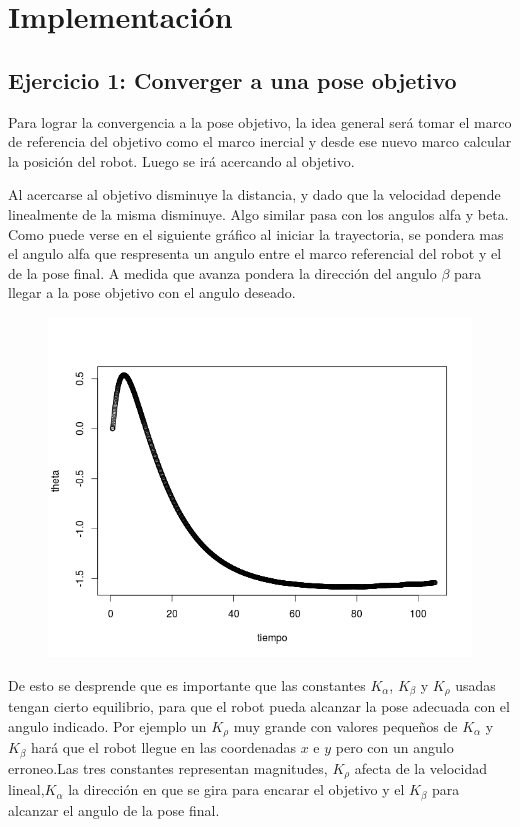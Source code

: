 \section{Implementación}

\subsection{Ejercicio 1: Converger a una pose objetivo}

Para lograr la convergencia a la pose objetivo, la idea general será tomar el marco de referencia del objetivo como el marco inercial y desde ese nuevo marco calcular la posición del robot. Luego se irá acercando al objetivo.

Al acercarse al objetivo disminuye la distancia, y dado que la velocidad depende linealmente de la misma disminuye. Algo similar pasa con los angulos alfa y beta. Como puede verse en el siguiente gráfico al iniciar la trayectoria, se pondera mas el angulo alfa que respresenta un angulo entre el marco referencial del robot y el de la pose final. A medida que avanza pondera la dirección del angulo $\beta$ para llegar a la pose objetivo con el angulo deseado.

\begin{figure}[!h]
\begin{center}
\includegraphics[scale=0.5]{ejercicio1}
\end{center}
\end{figure}
De esto se desprende que es importante que las constantes $K_\alpha$, $K_\beta$ y $K_\rho$ usadas tengan cierto equilibrio, para que el robot pueda alcanzar la pose adecuada con el angulo indicado. Por ejemplo un $K_\rho$ muy grande con valores pequeños de $K_\alpha$ y $K_\beta$ hará que el robot llegue en las coordenadas $x$ e $y$ pero con un angulo erroneo.Las tres constantes representan magnitudes, $K_\rho$ afecta de la velocidad lineal,$K_\alpha$ la dirección en que se gira para encarar el objetivo y el $K_\beta$ para alcanzar el angulo de la pose final.

